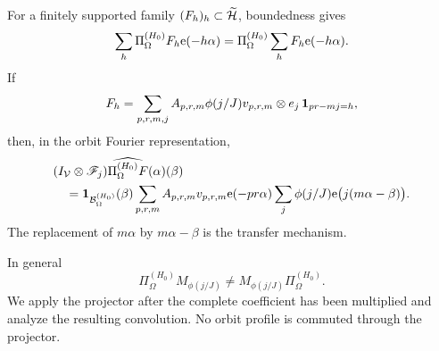 For a finitely supported family \((F_h)_h\subset\widetilde{\mathcal H}\),
boundedness gives
\begin{equation}
 \sum_h\Pi_{\Omega}^{(H_0)}F_h\mathrm e(-h\alpha)
 =\Pi_{\Omega}^{(H_0)}\sum_hF_h\mathrm e(-h\alpha).
 \label{eq:tpc47-projector-shift-commutation}
\end{equation}
If
\begin{equation}
 F_h=\sum_{p,r,m,j}A_{p,r,m}\phi(j/J)
 v_{p,r,m}\otimes e_j\,\mathbf 1_{pr-mj=h},
 \label{eq:tpc47-projector-model-packet}
\end{equation}
then, in the orbit Fourier representation,
\begin{align}
 &(I_{\mathcal V}\otimes\mathscr F_j)
 \widehat{\Pi_{\Omega}^{(H_0)}F}(\alpha)(\beta)
 \notag\\
 &\quad={}
 \mathbf 1_{\mathcal B_{\Omega}^{(H_0)}}(\beta)
 \sum_{p,r,m}A_{p,r,m}v_{p,r,m}\mathrm e(-pr\alpha)
 \sum_j\phi(j/J)\mathrm e\bigl(j(m\alpha-\beta)\bigr).
 \label{eq:tpc47-projected-orbit-kernel-preview}
\end{align}
The replacement of \(m\alpha\) by \(m\alpha-\beta\) is the transfer
mechanism.

\begin{remark}
\label{rem:tpc47-no-multiplier-commutation}
In general
\begin{equation}
 \Pi_{\Omega}^{(H_0)}M_{\phi(j/J)}
 \ne M_{\phi(j/J)}\Pi_{\Omega}^{(H_0)}.
 \label{eq:tpc47-forbidden-commutation}
\end{equation}
We apply the projector after the complete coefficient has been
multiplied and analyze the resulting convolution.  No orbit profile is
commuted through the projector.
\end{remark}
